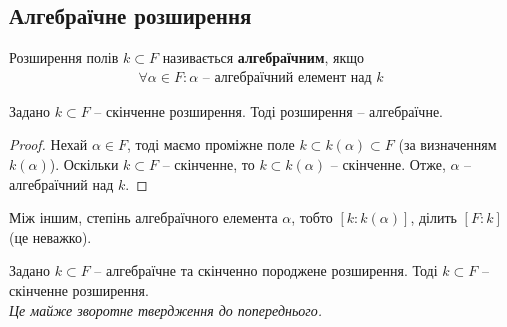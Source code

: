 \documentclass{math_library}
\begin{document}
\subsection{Алгебраїчне розширення}
\begin{definition}
Розширення полів $k \subset F$ називається \textbf{алгебраїчним}, якщо
\begin{align*}
\forall \alpha \in F: \alpha \text{ -- алгебраїчний елемент над }k
\end{align*}
\end{definition}

\begin{proposition}
Задано $k \subset F$ -- скінченне розширення. Тоді розширення -- алгебраїчне.
\end{proposition}

\begin{proof}
Нехай $\alpha \in F$, тоді маємо проміжне поле $k \subset k(\alpha) \subset F$ (за визначенням $k(\alpha)$). Оскільки $k \subset F$ -- скінченне, то $k \subset k(\alpha)$ -- скінченне. Отже, $\alpha$ -- алгебраїчний над $k$.
\end{proof}

Між іншим, степінь алгебраїчного елемента $\alpha$, тобто $[k:k(\alpha)]$, ділить $[F:k]$ (це неважко).

\begin{proposition}
Задано $k \subset F$ -- алгебраїчне та скінченно породжене розширення. Тоді $k \subset F$ -- скінченне розширення.\\
\textit{Це майже зворотне твердження до попереднього.}
\end{proposition}
\end{document}

